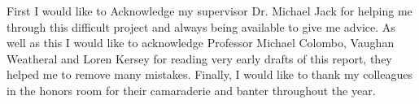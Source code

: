 First I would like to Acknowledge my supervisor Dr. Michael Jack for helping me through this difficult project and always being available to give me advice. As well as this I would like to acknowledge Professor Michael Colombo, Vaughan Weatheral and Loren Kersey for reading very early drafts of this report, they helped me to remove many mistakes. Finally, I would like to thank my colleagues in the honors room for their camaraderie and banter throughout the year.